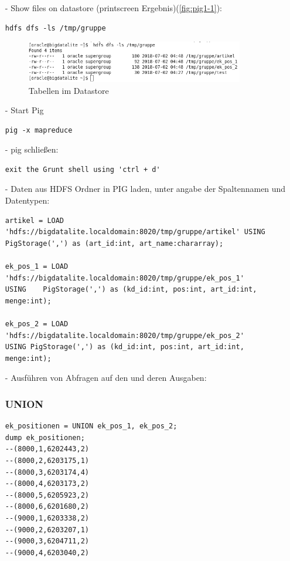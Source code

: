 \begin{itemize}
\item[-] Show files on datastore (printscreen Ergebnis)(\autoref{fig:pig1-1}):
\begin{lstlisting}
hdfs dfs -ls /tmp/gruppe
\end{lstlisting}
\begin{figure}[!htb]
        \begin{minipage}{1\textwidth}
                \centering
                \includegraphics[width=0.90\textwidth]{pics/HDFS_2.png}\par\vspace{0cm}
                \caption{Tabellen im Datastore}
                \label{fig:pig1-1}
        \end{minipage}
\end{figure}

\item[-] Start Pig
\begin{lstlisting}
pig -x mapreduce
\end{lstlisting}

\item[-] pig schließen: 
\begin{lstlisting}
exit the Grunt shell using 'ctrl + d'
\end{lstlisting}

\item[-] Daten aus HDFS Ordner in PIG laden, unter angabe der Spaltennamen und Datentypen:
\begin{lstlisting}
artikel = LOAD 'hdfs://bigdatalite.localdomain:8020/tmp/gruppe/artikel' USING
PigStorage(',') as (art_id:int, art_name:chararray);

ek_pos_1 = LOAD 'hdfs://bigdatalite.localdomain:8020/tmp/gruppe/ek_pos_1'       USING    PigStorage(',') as (kd_id:int, pos:int, art_id:int, menge:int);

ek_pos_2 = LOAD 'hdfs://bigdatalite.localdomain:8020/tmp/gruppe/ek_pos_2'       USING PigStorage(',') as (kd_id:int, pos:int, art_id:int, menge:int);
\end{lstlisting}
\item[-] Ausführen von Abfragen auf den und deren Ausgaben:
\subsubsection*{UNION}
\begin{lstlisting}
ek_positionen = UNION ek_pos_1, ek_pos_2;
dump ek_positionen;
--(8000,1,6202443,2)
--(8000,2,6203175,1)
--(8000,3,6203174,4)
--(8000,4,6203173,2)
--(8000,5,6205923,2)
--(8000,6,6201680,2)
--(9000,1,6203338,2)
--(9000,2,6203207,1)
--(9000,3,6204711,2)
--(9000,4,6203040,2)
\end{lstlisting}


\end{itemize}
